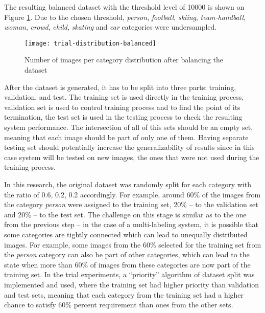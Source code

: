     The resulting balanced dataset with the threshold level of 10000 is shown on Figure \ref{fig:trial-distribution-balanced}. Due to the chosen threshold, \textit{person}, \textit{football}, \textit{skiing}, \textit{team-handball}, \textit{woman}, \textit{crowd}, \textit{child}, \textit{skating} and \textit{car} categories were undersampled.
    
    \begin{figure}[h!]
    \centering
    \texttt{[image: trial-distribution-balanced]}
    \caption{Number of images per category distribution after balancing the dataset}
    \label{fig:trial-distribution-balanced}
    \end{figure}
    
    
    After the dataset is generated, it has to be split into three parts: training, validation, and test. The training set is used directly in the training process, validation set is used to control training process and to find the point of its termination, the test set is used in the testing process to check the resulting system performance. The intersection of all of this sets should be an empty set, meaning that each image should be part of only one of them. Having separate testing set should potentially increase the generalizability of results since in this case system will be tested on new images, the ones that were not used during the training process. 
    
    In this research, the original dataset was randomly split for each category with the ratio of 0.6, 0.2, 0.2 accordingly. For example, around 60\% of the images from the category \textit{person} were assigned to the training set, 20\% -- to the validation set and 20\% -- to the test set. The challenge on this stage is similar as to the one from the previous step -- in the case of a multi-labeling system, it is possible that some categories are tightly connected which can lead to unequally distributed images. For example, some images from the 60\% selected for the training set from the \textit{person} category can also be part of other categories, which can lead to the state when more than 60\% of images from these categories are now part of the training set. In the trial experiments, a ``priority'' algorithm of dataset split was implemented and used, where the training set had higher priority than validation and test sets, meaning that each category from the training set had a higher chance to satisfy 60\% percent requirement than ones from the other sets.
    
